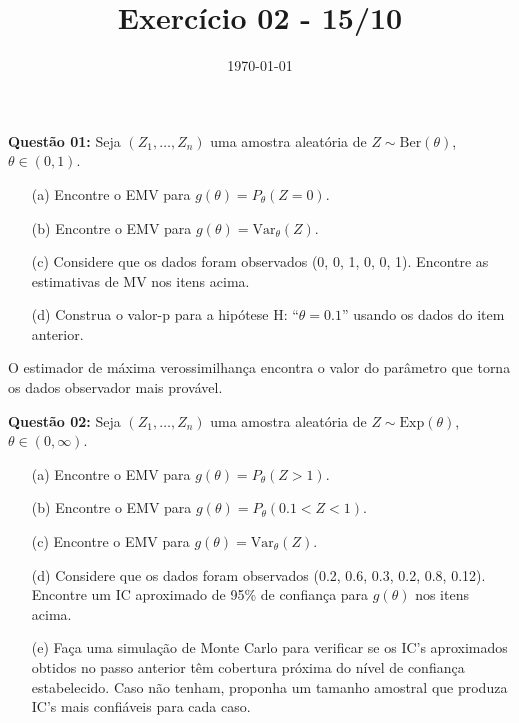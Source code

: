 \documentclass[a4paper]{article}
\date{\today}
\title{Exercício 02 - 15/10}
\begin{document}
    \header{}

\textbf{Questão 01:}  
Seja $(Z_1, \ldots, Z_n)$ uma amostra aleatória de $Z \sim \text{Ber}(\theta)$, $\theta \in (0,1)$.
\begin{itemize}
  \item[(a)] Encontre o EMV para $g(\theta) = P_\theta(Z = 0)$.
  \item[(b)] Encontre o EMV para $g(\theta) = \mathrm{Var}_\theta(Z)$.
  \item[(c)] Considere que os dados foram observados (0, 0, 1, 0, 0, 1). Encontre as estimativas de MV nos itens acima.
  \item[(d)] Construa o valor-p para a hipótese H: ``$\theta = 0.1$'' usando os dados do item anterior.
\end{itemize}

    \begin{answer}[]
O estimador de máxima verossimilhança encontra o valor do parâmetro \theta que torna os dados observador mais provável.

    \end{answer}

\textbf{Questão 02:}  
Seja $(Z_1, \ldots, Z_n)$ uma amostra aleatória de $Z \sim \text{Exp}(\theta)$, $\theta \in (0,\infty)$.
\begin{itemize}
  \item[(a)] Encontre o EMV para $g(\theta) = P_\theta(Z > 1)$.
  \item[(b)] Encontre o EMV para $g(\theta) = P_\theta(0.1 < Z < 1)$.
  \item[(c)] Encontre o EMV para $g(\theta) = \mathrm{Var}_\theta(Z)$.
  \item[(d)] Considere que os dados foram observados (0.2, 0.6, 0.3, 0.2, 0.8, 0.12). Encontre um IC aproximado de 95\% de confiança para $g(\theta)$ nos itens acima.
  \item[(e)] Faça uma simulação de Monte Carlo para verificar se os IC's aproximados obtidos no passo anterior têm cobertura próxima do nível de confiança estabelecido. Caso não tenham, proponha um tamanho amostral que produza IC's mais confiáveis para cada caso.
\end{itemize}

    \begin{answer}[]

    \end{answer}
\end{document}

